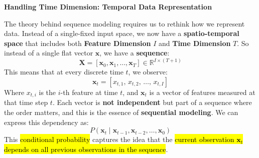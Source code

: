 \highspace
\begin{flushleft}
    \textcolor{Green3}{ \textbf{Handling Time Dimension: Temporal Data Representation}}
\end{flushleft}
The theory behind sequence modeling requires us to rethink how we represent data. Instead of a single-fixed input space, we now have a \textbf{spatio-temporal space} that includes both \textbf{Feature Dimension} $I$ and \textbf{Time Dimension} $T$. So instead of a single flat vector $\mathbf{x}$, we have a \textbf{sequence}:
\begin{equation*}
    \mathbf{X} = \left[\mathbf{x}_0, \mathbf{x}_1, \dots, \mathbf{x}_T\right] \in \mathbb{R}^{I \times (T+1)}
\end{equation*}
This means that at every discrete time $t$, we observe:
\begin{equation*}
    \mathbf{x}_t = \left[x_{t,1}, \, x_{t,2}, \, \dots, \, x_{t,I}\right]
\end{equation*}
Where $x_{t,i}$ is the $i$-th feature at time $t$, and $\mathbf{x}_t$ is a vector of features measured at that time step $t$. Each vector is \textbf{not independent} but part of a sequence where the order matters, and this is the essence of \textbf{sequential modeling}. We can express this dependency as:
\begin{equation}\label{eq:sequence-modeling-probability}
    P\left(\mathbf{x}_t \mid \mathbf{x}_{t-1}, \mathbf{x}_{t-2}, \dots, \mathbf{x}_0\right)
\end{equation}
This \hl{conditional probability} captures the idea that the \hl{current observation $\mathbf{x}_t$ depends on all previous observations in the sequence}.

